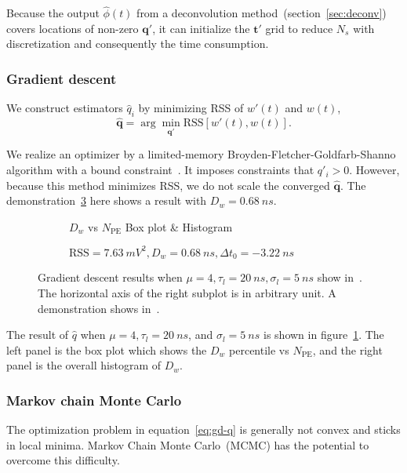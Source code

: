 Because the output $\hat{\phi}(t)$ from a deconvolution method~(section~\ref{sec:deconv}) covers locations of non-zero $\bm{q}'$, it can initialize the $\bm{t}'$ grid to reduce $N_s$ with discretization and consequently the time consumption. 

\subsubsection{Gradient descent}

We construct estimators $\hat{q}_i$ by minimizing RSS of $w'(t)$ and $w(t)$, 
\begin{equation}
  \label{eq:gd-q}
  \bm{\hat{q}} = \arg \underset{\bm{q'}}{\min} \mathrm{RSS}\left[w'(t),w(t)\right].
\end{equation}

We realize an optimizer by a limited-memory Broyden-Fletcher-Goldfarb-Shanno algorithm with a bound constraint~\cite{byrd_limited_1995}. It imposes constraints that $q'_i > 0$. However, because this method minimizes RSS, we do not scale the converged $\bm{\hat{q}}$. The demonstration~\ref{fig:fitting} here shows a result with $D_w = \SI{0.68}{ns}$.

\begin{figure}[H]
  \begin{subfigure}{.5\textwidth}
    \centering
    \resizebox{\textwidth}{!}{}
    \caption{\label{fig:fitting-npe} $D_w$ vs $N_{\mathrm{PE}}$ Box plot \& Histogram}
  \end{subfigure}
  \begin{subfigure}{.5\textwidth}
    \centering
    \resizebox{\textwidth}{!}{}
    \caption{\label{fig:fitting}$\mathrm{RSS}=\SI{7.63}{mV^2},D_w=\SI{0.68}{ns},\Delta{t_0}=\SI{-3.22}{ns}$}
  \end{subfigure}
  \caption{Gradient descent results when $\mu=4, \tau_l=\SI{20}{ns}, \sigma_l=\SI{5}{ns}$ show in~. The horizontal axis of the right subplot is in arbitrary unit. A demonstration shows in~.}
\end{figure}

The result of $\hat{q}$ when $\mu=4, \tau_l=\SI{20}{ns}$, and $\sigma_l=\SI{5}{ns}$ is shown in figure~\ref{fig:fitting-npe}. The left panel is the box plot which shows the $D_w$ percentile vs $N_{\mathrm{PE}}$, and the right panel is the overall histogram of $D_w$. 

\subsubsection{Markov chain Monte Carlo}
\label{subsec:mcmc}
The optimization problem in equation~\eqref{eq:gd-q} is generally not convex and sticks in local minima. Markov Chain Monte Carlo~(MCMC) has the potential to overcome this difficulty.

